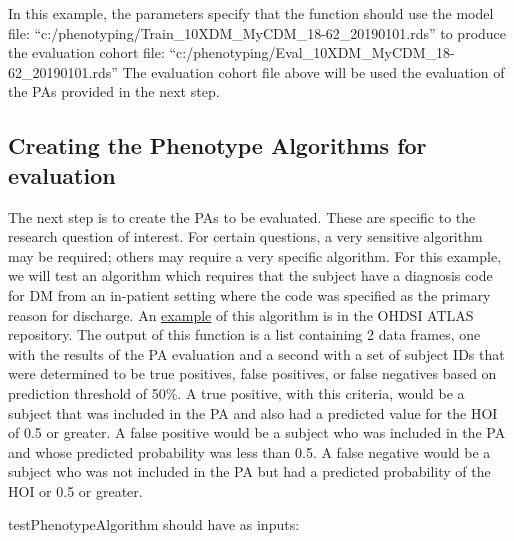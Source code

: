 \documentclass[
]{article}
\begin{document}
In this example, the parameters specify that the function should use the
model file: ``c:/phenotyping/Train\_10XDM\_MyCDM\_18-62\_20190101.rds''
to produce the evaluation cohort file:
``c:/phenotyping/Eval\_10XDM\_MyCDM\_18-62\_20190101.rds'' The
evaluation cohort file above will be used the evaluation of the PAs
provided in the next step.

\hypertarget{creating-the-phenotype-algorithms-for-evaluation}{%
\subsection{Creating the Phenotype Algorithms for
evaluation}\label{creating-the-phenotype-algorithms-for-evaluation}}

The next step is to create the PAs to be evaluated. These are specific
to the research question of interest. For certain questions, a very
sensitive algorithm may be required; others may require a very specific
algorithm. For this example, we will test an algorithm which requires
that the subject have a diagnosis code for DM from an in-patient setting
where the code was specified as the primary reason for discharge. An
\href{http://www.ohdsi.org/web/atlas/\#/cohortdefinition/1769702}{example}
of this algorithm is in the OHDSI ATLAS repository. The output of this
function is a list containing 2 data frames, one with the results of the
PA evaluation and a second with a set of subject IDs that were
determined to be true positives, false positives, or false negatives
based on prediction threshold of 50\%. A true positive, with this
criteria, would be a subject that was included in the PA and also had a
predicted value for the HOI of 0.5 or greater. A false positive would be
a subject who was included in the PA and whose predicted probability was
less than 0.5. A false negative would be a subject who was not included
in the PA but had a predicted probability of the HOI or 0.5 or greater.

testPhenotypeAlgorithm should have as inputs:
\end{document}
